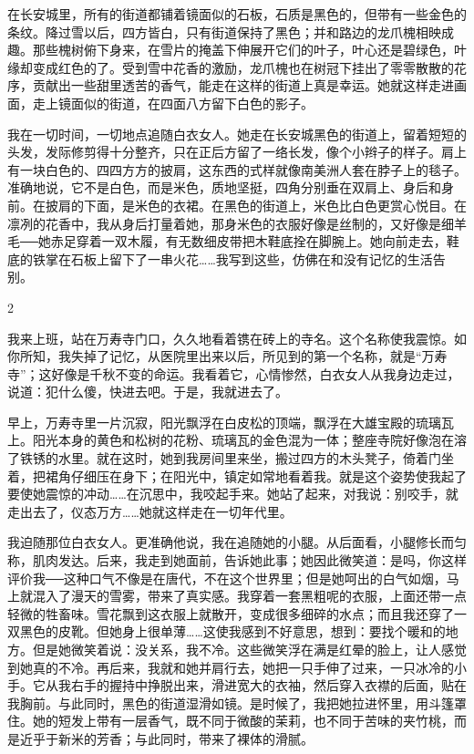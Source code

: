 在长安城里，所有的街道都铺着镜面似的石板，石质是黑色的，但带有一些金色的条纹。降过雪以后，四方皆白，只有街道保持了黑色；并和路边的龙爪槐相映成趣。那些槐树俯下身来，在雪片的掩盖下伸展开它们的叶子，叶心还是碧绿色，叶缘却变成红色的了。受到雪中花香的激励，龙爪槐也在树冠下挂出了零零散散的花序，贡献出一些甜里透苦的香气，能走在这样的街道上真是幸运。她就这样走进画面，走上镜面似的街道，在四面八方留下白色的影子。 

我在一切时间，一切地点追随白衣女人。她走在长安城黑色的街道上，留着短短的头发，发际修剪得十分整齐，只在正后方留了一络长发，像个小辫子的样子。肩上有一块白色的、四四方方的披肩，这东西的式样就像南美洲人套在脖子上的毯子。准确地说，它不是白色，而是米色，质地坚挺，四角分别垂在双肩上、身后和身前。在披肩的下面，是米色的衣裙。在黑色的街道上，米色比白色更赏心悦目。在凛冽的花香中，我从身后打量着她，那身米色的衣服好像是丝制的，又好像是细羊毛──她赤足穿着一双木履，有无数细皮带把木鞋底拴在脚腕上。她向前走去，鞋底的铁掌在石板上留下了一串火花……我写到这些，仿佛在和没有记忆的生活告别。 

2 

我来上班，站在万寿寺门口，久久地看着镌在砖上的寺名。这个名称使我震惊。如你所知，我失掉了记忆，从医院里出来以后，所见到的第一个名称，就是“万寿寺”；这好像是千秋不变的命运。我看着它，心情惨然，白衣女人从我身边走过，说道：犯什么傻，快进去吧。于是，我就进去了。 

早上，万寿寺里一片沉寂，阳光飘浮在白皮松的顶端，飘浮在大雄宝殿的琉璃瓦上。阳光本身的黄色和松树的花粉、琉璃瓦的金色混为一体；整座寺院好像泡在溶了铁锈的水里。就在这时，她到我房间里来坐，搬过四方的木头凳子，倚着门坐着，把裙角仔细压在身下；在阳光中，镇定如常地看着我。就是这个姿势使我起了要使她震惊的冲动……在沉思中，我咬起手来。她站了起来，对我说：别咬手，就走出去了，仪态万方……她就这样走在一切年代里。 

我迫随那位白衣女人。更准确他说，我在追随她的小腿。从后面看，小腿修长而匀称，肌肉发达。后来，我走到她面前，告诉她此事；她因此微笑道：是吗，你这样评价我──这种口气不像是在唐代，不在这个世界里；但是她呵出的白气如烟，马上就混入了漫天的雪雾，带来了真实感。我穿着一套黑粗呢的衣服，上面还带一点轻微的牲畜味。雪花飘到这衣服上就散开，变成很多细碎的水点；而且我还穿了一双黑色的皮靴。但她身上很单薄……这使我感到不好意思，想到：要找个暖和的地方。但是她微笑着说：没关系，我不冷。这些微笑浮在满是红晕的脸上，让人感觉到她真的不冷。再后来，我就和她并肩行去，她把一只手伸了过来，一只冰冷的小手。它从我右手的握持中挣脱出来，滑进宽大的衣袖，然后穿入衣襟的后面，贴在我胸前。与此同时，黑色的街道湿滑如镜。是时候了，我把她拉进怀里，用斗篷罩住。她的短发上带有一层香气，既不同于微酸的茉莉，也不同于苦味的夹竹桃，而是近乎于新米的芳香；与此同时，带来了裸体的滑腻。 

